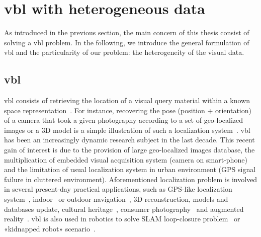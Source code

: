 \section{\Acl*{vbl} with heterogeneous data}

As introduced in the previous section, the main concern of this thesis consist of solving a \ac{vbl} problem. In the following, we introduce the general formulation of \ac{vbl} and the particularity of our problem: the heterogeneity of the visual data.

\subsection{\Acl*{vbl}}
	\Ac{vbl} consists of retrieving the location of a visual query material within a known space representation~\citep{Zamir2016, Piasco2017, Brejcha2017}. For instance, recovering the pose (position + orientation) of a camera that took a given photography according to a set of geo-localized images or a 3D model is a simple illustration of such a localization system~\citep{Kendall2015, Sattler2016a}. \ac{vbl} has been an increasingly dynamic research subject in the last decade. This recent gain of interest is due to the provision of large geo-localized images database, the multiplication of embedded visual acquisition system (\eg camera on smart-phone) and the limitation of usual localization system in urban environment (\eg GPS signal failure in cluttered environment). Aforementioned localization problem is involved in several present-day practical applications, such as GPS-like localization system~\citep{Armagan2017b}, indoor~\citep{Cavallari2018} or outdoor navigation~\citep{Brahmbhatt2017}, 3D reconstruction, models and databases update, cultural heritage~\citep{Bhowmik2017}, consumer photography~\citep{Hays2008, Weyand2016} and augmented reality~\citep{Glocker2013}. \Ac{vbl} is also used in robotics to solve SLAM loop-closure problem~\citep{Garg2018a} or «kidnapped robot» scenario~\citep{Cupec}.
	
